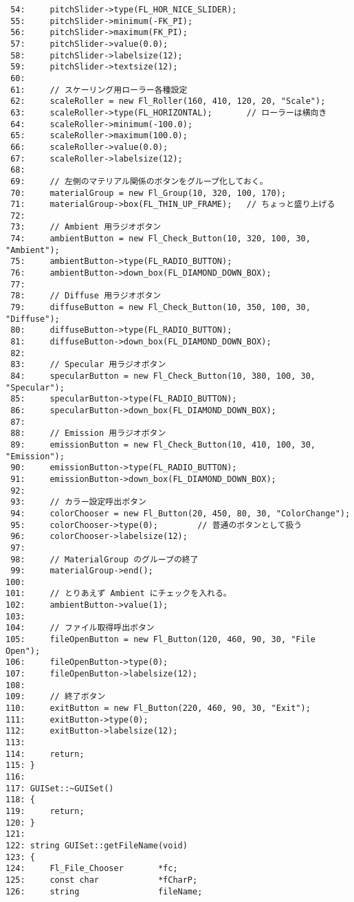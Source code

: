 \begin{breakbox}
\begin{verbatim}
 54:     pitchSlider->type(FL_HOR_NICE_SLIDER);
 55:     pitchSlider->minimum(-FK_PI);
 56:     pitchSlider->maximum(FK_PI);
 57:     pitchSlider->value(0.0);
 58:     pitchSlider->labelsize(12);
 59:     pitchSlider->textsize(12);
 60: 
 61:     // スケーリング用ローラー各種設定
 62:     scaleRoller = new Fl_Roller(160, 410, 120, 20, "Scale");
 63:     scaleRoller->type(FL_HORIZONTAL);       // ローラーは横向き
 64:     scaleRoller->minimum(-100.0);
 65:     scaleRoller->maximum(100.0);
 66:     scaleRoller->value(0.0);
 67:     scaleRoller->labelsize(12);
 68: 
 69:     // 左側のマテリアル関係のボタンをグループ化しておく。
 70:     materialGroup = new Fl_Group(10, 320, 100, 170);
 71:     materialGroup->box(FL_THIN_UP_FRAME);   // ちょっと盛り上げる
 72: 
 73:     // Ambient 用ラジオボタン
 74:     ambientButton = new Fl_Check_Button(10, 320, 100, 30, "Ambient");
 75:     ambientButton->type(FL_RADIO_BUTTON);
 76:     ambientButton->down_box(FL_DIAMOND_DOWN_BOX);
 77: 
 78:     // Diffuse 用ラジオボタン
 79:     diffuseButton = new Fl_Check_Button(10, 350, 100, 30, "Diffuse");
 80:     diffuseButton->type(FL_RADIO_BUTTON);
 81:     diffuseButton->down_box(FL_DIAMOND_DOWN_BOX);
 82: 
 83:     // Specular 用ラジオボタン
 84:     specularButton = new Fl_Check_Button(10, 380, 100, 30, "Specular");
 85:     specularButton->type(FL_RADIO_BUTTON);
 86:     specularButton->down_box(FL_DIAMOND_DOWN_BOX);
 87: 
 88:     // Emission 用ラジオボタン
 89:     emissionButton = new Fl_Check_Button(10, 410, 100, 30, "Emission");
 90:     emissionButton->type(FL_RADIO_BUTTON);
 91:     emissionButton->down_box(FL_DIAMOND_DOWN_BOX);
 92: 
 93:     // カラー設定呼出ボタン
 94:     colorChooser = new Fl_Button(20, 450, 80, 30, "ColorChange");
 95:     colorChooser->type(0);        // 普通のボタンとして扱う
 96:     colorChooser->labelsize(12);
 97: 
 98:     // MaterialGroup のグループの終了
 99:     materialGroup->end();
100: 
101:     // とりあえず Ambient にチェックを入れる。
102:     ambientButton->value(1);
103: 
104:     // ファイル取得呼出ボタン
105:     fileOpenButton = new Fl_Button(120, 460, 90, 30, "File Open");
106:     fileOpenButton->type(0);
107:     fileOpenButton->labelsize(12);
108: 
109:     // 終了ボタン
110:     exitButton = new Fl_Button(220, 460, 90, 30, "Exit");
111:     exitButton->type(0);
112:     exitButton->labelsize(12);
113: 
114:     return;
115: }
116: 
117: GUISet::~GUISet()
118: {
119:     return;
120: }
121: 
122: string GUISet::getFileName(void)
123: {
124:     Fl_File_Chooser       *fc;
125:     const char            *fCharP;
126:     string                fileName;

\end{verbatim}
\end{breakbox}
